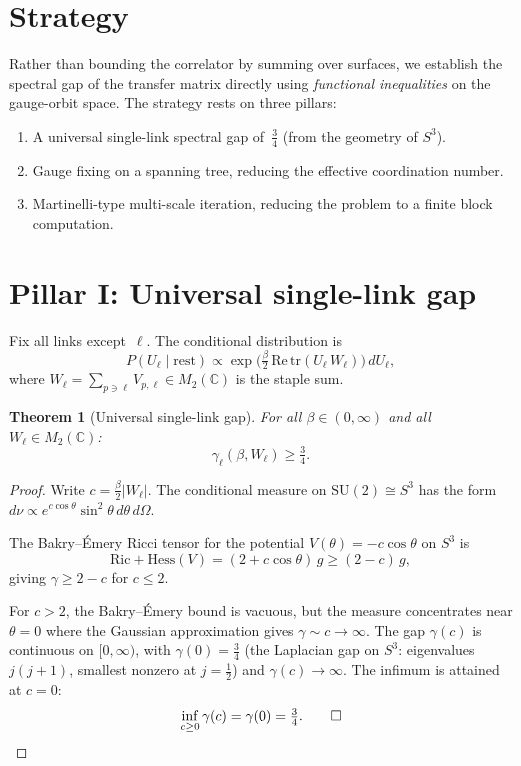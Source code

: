 \documentclass[12pt,a4paper]{article}
\newtheorem{theorem}{Theorem}[section]
\newcommand{\C}{\mathbb{C}}
\newcommand{\half}{\tfrac{1}{2}}
\newcommand{\tr}{\mathrm{tr}}
\newcommand{\Ric}{\mathrm{Ric}}
\newcommand{\Hess}{\mathrm{Hess}}
\begin{document}
\section{Strategy}\label{sec:strategy}

Rather than bounding the correlator by summing over surfaces, we establish the spectral gap of the transfer matrix directly using \emph{functional inequalities} on the gauge-orbit space. The strategy rests on three pillars:
\begin{enumerate}[nosep]
\item A universal single-link spectral gap of~$\frac{3}{4}$ (from the geometry of $S^3$).
\item Gauge fixing on a spanning tree, reducing the effective coordination number.
\item Martinelli-type multi-scale iteration, reducing the problem to a finite block computation.
\end{enumerate}

\section{Pillar I: Universal single-link gap}\label{sec:single}

Fix all links except~$\ell$. The conditional distribution is
\begin{equation}\label{eq:conditional}
P(U_\ell\mid\text{rest}) \propto \exp\!\bigl(\tfrac{\beta}{2}\,\mathrm{Re}\,\tr(U_\ell\, W_\ell)\bigr)\,dU_\ell,
\end{equation}
where $W_\ell=\sum_{p\ni\ell}V_{p,\ell}\in M_2(\C)$ is the staple sum.

\begin{theorem}[Universal single-link gap]\label{thm:single}
For all $\beta\in(0,\infty)$ and all $W_\ell\in M_2(\C)$:
\begin{equation}
\gamma_\ell(\beta,W_\ell) \ge \tfrac{3}{4}.
\end{equation}
\end{theorem}

\begin{proof}
Write $c=\frac{\beta}{2}|W_\ell|$. The conditional measure on $\mathrm{SU}(2)\cong S^3$ has the form $d\nu\propto e^{c\cos\theta}\sin^2\theta\,d\theta\,d\Omega$.

The Bakry--\'Emery Ricci tensor for the potential $V(\theta)=-c\cos\theta$ on $S^3$ is
\begin{equation}
\Ric + \Hess(V) = (2 + c\cos\theta)\,g \ge (2-c)\,g,
\end{equation}
giving $\gamma\ge 2-c$ for $c\le 2$.

For $c>2$, the Bakry--\'Emery bound is vacuous, but the measure concentrates near $\theta=0$ where the Gaussian approximation gives $\gamma\sim c\to\infty$. The gap $\gamma(c)$ is continuous on $[0,\infty)$, with $\gamma(0)=\frac{3}{4}$ (the Laplacian gap on $S^3$: eigenvalues $j(j{+}1)$, smallest nonzero at $j=\half$) and $\gamma(c)\to\infty$. The infimum is attained at $c=0$:
\begin{equation}
\inf_{c\ge 0}\gamma(c) = \gamma(0) = \tfrac{3}{4}.\qed
\end{equation}
\end{proof}
\end{document}
